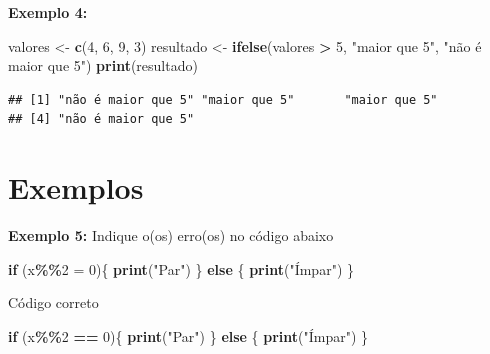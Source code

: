 \documentclass[
]{book}
\newenvironment{Shaded}{\begin{snugshade}}{\end{snugshade}}
\newcommand{\ControlFlowTok}[1]{\textcolor[rgb]{0.13,0.29,0.53}{\textbf{#1}}}
\newcommand{\DecValTok}[1]{\textcolor[rgb]{0.00,0.00,0.81}{#1}}
\newcommand{\FunctionTok}[1]{\textcolor[rgb]{0.13,0.29,0.53}{\textbf{#1}}}
\newcommand{\NormalTok}[1]{#1}
\newcommand{\OtherTok}[1]{\textcolor[rgb]{0.56,0.35,0.01}{#1}}
\newcommand{\SpecialCharTok}[1]{\textcolor[rgb]{0.81,0.36,0.00}{\textbf{#1}}}
\newcommand{\StringTok}[1]{\textcolor[rgb]{0.31,0.60,0.02}{#1}}
\theoremstyle{definition}
\theoremstyle{definition}
\theoremstyle{definition}
\theoremstyle{definition}
\theoremstyle{remark}
\begin{document}
\textbf{Exemplo 4:}

\begin{Shaded}
\begin{Highlighting}[]
\NormalTok{valores }\OtherTok{\textless{}{-}} \FunctionTok{c}\NormalTok{(}\DecValTok{4}\NormalTok{, }\DecValTok{6}\NormalTok{, }\DecValTok{9}\NormalTok{, }\DecValTok{3}\NormalTok{)}
\NormalTok{resultado }\OtherTok{\textless{}{-}} \FunctionTok{ifelse}\NormalTok{(valores }\SpecialCharTok{\textgreater{}} \DecValTok{5}\NormalTok{, }\StringTok{"maior que 5"}\NormalTok{, }\StringTok{"não é maior que 5"}\NormalTok{)}
\FunctionTok{print}\NormalTok{(resultado)}
\end{Highlighting}
\end{Shaded}

\begin{verbatim}
## [1] "não é maior que 5" "maior que 5"       "maior que 5"      
## [4] "não é maior que 5"
\end{verbatim}

\section{Exemplos}\label{exemplos}

\textbf{Exemplo 5:} Indique o(os) erro(os) no código abaixo

\begin{Shaded}
\begin{Highlighting}[]
\ControlFlowTok{if}\NormalTok{ (x}\SpecialCharTok{\%\%}\DecValTok{2} \OtherTok{=} \DecValTok{0}\NormalTok{)\{  }
      \FunctionTok{print}\NormalTok{(}\StringTok{"Par"}\NormalTok{)}
\NormalTok{\} }\ControlFlowTok{else}\NormalTok{ \{  }
    \FunctionTok{print}\NormalTok{(}\StringTok{"Ímpar"}\NormalTok{)}
\NormalTok{\}}
\end{Highlighting}
\end{Shaded}

Código correto

\begin{Shaded}
\begin{Highlighting}[]
\ControlFlowTok{if}\NormalTok{ (x}\SpecialCharTok{\%\%}\DecValTok{2} \SpecialCharTok{==} \DecValTok{0}\NormalTok{)\{  }
  \FunctionTok{print}\NormalTok{(}\StringTok{"Par"}\NormalTok{)}
\NormalTok{\} }\ControlFlowTok{else}\NormalTok{ \{  }
    \FunctionTok{print}\NormalTok{(}\StringTok{"Ímpar"}\NormalTok{)}
\NormalTok{\}}
\end{Highlighting}
\end{Shaded}
\end{document}
